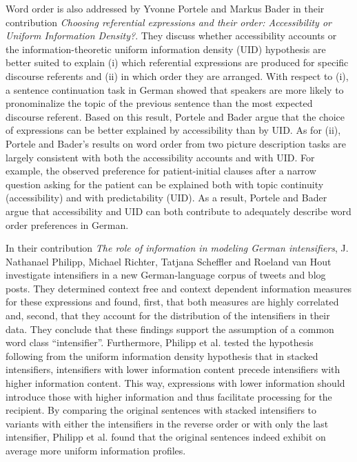 \documentclass[output=paper,colorlinks,citecolor=brown]{langscibook}
\begin{document}
Word order is also addressed by Yvonne Portele and Markus Bader in their contribution \textit{Choosing referential expressions and their order: Accessibility or Uniform Information Density?}. They discuss whether accessibility accounts or the information-theoretic uniform information density (UID) hypothesis are better suited to explain (i) which referential expressions are produced for specific discourse referents and (ii) in which order they are arranged.  With respect to (i), a sentence continuation task in German showed that speakers are more likely to pronominalize the topic of the previous sentence than the most expected discourse referent. Based on this result, Portele and Bader argue that the choice of expressions can be better explained by accessibility than by UID. As for (ii), Portele and Bader's results on word order from two picture description tasks are largely consistent with both the accessibility accounts and with UID. For example, the observed preference for patient-initial clauses after a narrow question asking for the patient can be explained both with topic continuity (accessibility) and with predictability (UID). As a result, Portele and Bader argue that accessibility and UID can both contribute to adequately describe word order preferences in German.

In their contribution \textit{The role of information in modeling German intensifiers}, J. Nathanael Philipp, Michael Richter, Tatjana Scheffler and Roeland van Hout investigate intensifiers in a new German-language corpus of tweets and blog posts. They determined context free and context dependent information measures for these expressions and found, first, that both measures are highly correlated and, second, that they account for the distribution of the intensifiers in their data. They conclude that these findings support the assumption of a common word class ``intensifier''. Furthermore, Philipp et al. tested the hypothesis following from the uniform information density hypothesis that in stacked intensifiers, intensifiers with lower information content precede intensifiers with higher information content. This way, expressions with lower information should introduce those with higher information and thus facilitate processing for the recipient. By comparing the original sentences with stacked intensifiers to variants with either the intensifiers in the reverse order or with only the last intensifier, Philipp et al. found that the original sentences indeed exhibit on average more uniform information profiles.
\end{document}
